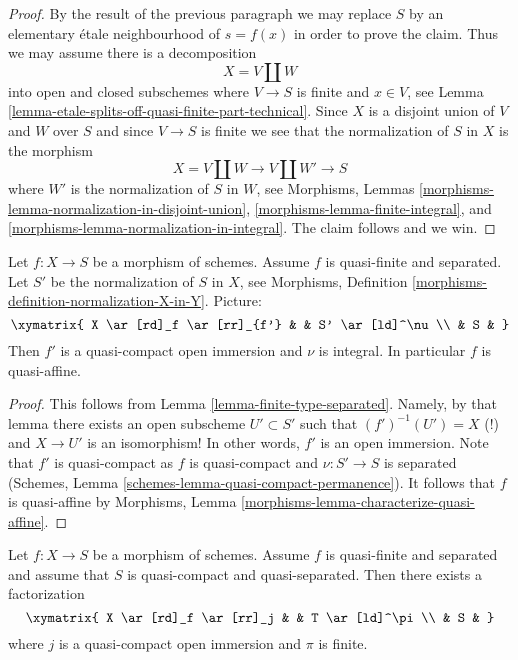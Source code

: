 \begin{proof}
\medskip\noindent
By the result of the previous paragraph we may replace $S$ by an
elementary \'etale neighbourhood of $s = f(x)$ in order to prove the claim.
Thus we may assume there is a decomposition
$$
X = V \amalg W
$$
into open and closed subschemes where $V \to S$ is finite and $x \in V$,
see Lemma \ref{lemma-etale-splits-off-quasi-finite-part-technical}.
Since $X$ is a disjoint union of $V$ and $W$ over $S$ and since
$V \to S$ is finite we see that the
normalization of $S$ in $X$ is the morphism
$$
X = V \amalg W \longrightarrow V \amalg W' \longrightarrow S
$$
where $W'$ is the normalization of $S$ in $W$, see
Morphisms, Lemmas \ref{morphisms-lemma-normalization-in-disjoint-union},
\ref{morphisms-lemma-finite-integral}, and
\ref{morphisms-lemma-normalization-in-integral}.
The claim follows and we win.
\end{proof}

\begin{lemma}
\label{lemma-quasi-finite-separated-quasi-affine}
Let $f : X \to S$ be a morphism of schemes.
Assume $f$ is quasi-finite and separated.
Let $S'$ be the normalization of $S$ in $X$, see
Morphisms, Definition \ref{morphisms-definition-normalization-X-in-Y}.
Picture:
$$
\xymatrix{
X \ar[rd]_f \ar[rr]_{f'} & & S' \ar[ld]^\nu \\
& S &
}
$$
Then $f'$ is a quasi-compact open immersion and $\nu$ is integral.
In particular $f$ is quasi-affine.
\end{lemma}

\begin{proof}
This follows from Lemma \ref{lemma-finite-type-separated}. Namely, by
that lemma there exists an open subscheme $U' \subset S'$ such that
$(f')^{-1}(U') = X$ (!) and $X \to U'$ is an isomorphism! In other
words, $f'$ is an open immersion. Note that $f'$ is quasi-compact as
$f$ is quasi-compact and $\nu : S' \to S$ is separated
(Schemes, Lemma \ref{schemes-lemma-quasi-compact-permanence}).
It follows that $f$ is quasi-affine by
Morphisms, Lemma \ref{morphisms-lemma-characterize-quasi-affine}.
\end{proof}

\begin{lemma}
\label{lemma-quasi-finite-separated-pass-through-finite}
\begin{reference}
\cite[IV Corollary 18.12.13]{EGA}
\end{reference}
Let $f : X \to S$ be a morphism of schemes.
Assume $f$ is quasi-finite and separated and assume that
$S$ is quasi-compact and quasi-separated. Then there exists
a factorization
$$
\xymatrix{
X \ar[rd]_f \ar[rr]_j & & T \ar[ld]^\pi \\
& S &
}
$$
where $j$ is a quasi-compact open immersion and $\pi$ is finite.
\end{lemma}

